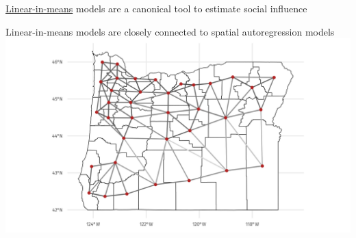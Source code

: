 \documentclass[aspectratio=169]{beamer}
\theoremstyle{remark}
\begin{document}
\begin{frame}{\underline{Linear-in-means} models are a canonical tool to estimate social influence}
\end{frame}

\begin{frame}{Linear-in-means models are closely connected to spatial autoregression models}
    \centering
    \includegraphics[height=0.95\textheight]{./figures/oregon_map.png}
\end{frame}
\end{document}
